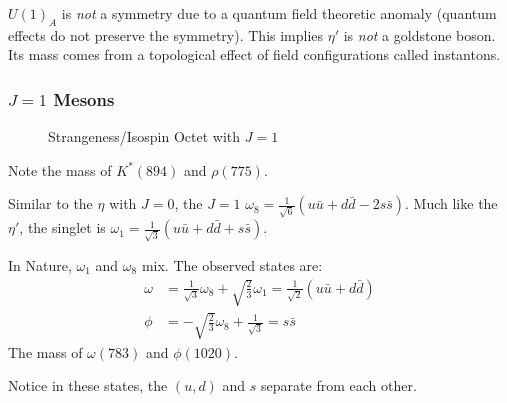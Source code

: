 $U(1)_A$ is \emph{not} a symmetry due to a quantum field theoretic anomaly (quantum effects do not preserve the symmetry). This implies $\eta'$ is \emph{not} a goldstone boson. Its mass comes from a topological effect of field configurations called instantons.

\subsubsection{$J=1$ Mesons}

\begin{figure}[H]
  \centering
  \caption{Strangeness/Isospin Octet with $J=1$}
  \label{fig:strangeisospin2}
\end{figure}
Note the mass of $K^*(894)$ and $\rho(775)$.

Similar to the $\eta$ with $J=0$, the $J=1$ $\omega_8=\frac1{\sqrt{6}}(u\bar{u}+d\bar{d}-2s\bar{s})$. Much like the $\eta'$, the singlet is $\omega_1=\frac1{\sqrt{3}}(u\bar{u}+d\bar{d}+s\bar{s})$.

In Nature, $\omega_1$ and $\omega_8$ mix. The observed states are:
\begin{align*}
  \omega&=\frac1{\sqrt{3}}\omega_8+\sqrt{\frac23}\omega_1=
  \frac1{\sqrt{2}}(u\bar{u}+d\bar{d})\\
  \phi&=-\sqrt{\frac23}\omega_8+\frac1{\sqrt{3}}=s\bar{s}
\end{align*}
The mass of $\omega(783)$ and $\phi(1020)$.

Notice in these states, the $(u,d)$ and $s$ separate from each other.


